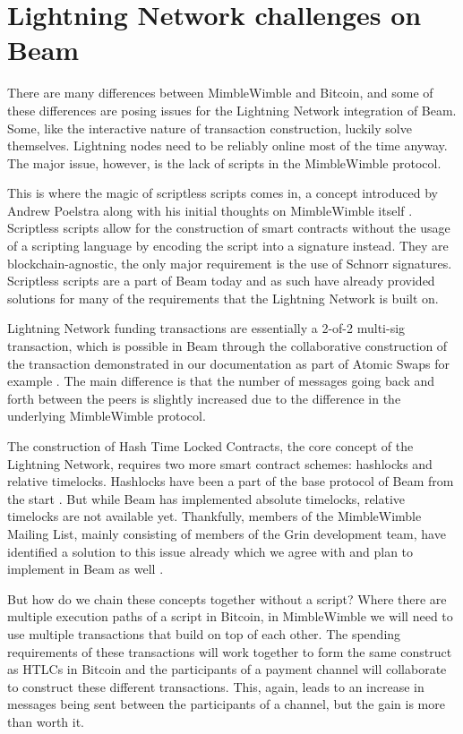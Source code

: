 \documentclass[letterpaper]{article}
\begin{document}
\section{Lightning Network challenges on Beam}
There are many differences between MimbleWimble and Bitcoin, and some of these differences are posing issues for the Lightning Network integration of Beam. Some, like the interactive nature of transaction construction, luckily solve themselves. Lightning nodes need to be reliably online most of the time anyway. The major issue, however, is the lack of scripts in the MimbleWimble protocol. 

This is where the magic of scriptless scripts comes in, a concept introduced by Andrew Poelstra along with his initial thoughts on MimbleWimble itself \cite{poelstra}. Scriptless scripts allow for the construction of smart contracts without the usage of a scripting language by encoding the script into a signature instead. They are blockchain-agnostic, the only major requirement is the use of Schnorr signatures. Scriptless scripts are a part of Beam today and as such have already provided solutions for many of the requirements that the Lightning Network is built on.

Lightning Network funding transactions are essentially a 2-of-2 multi-sig transaction, which is possible in Beam through the collaborative construction of the transaction demonstrated in our documentation as part of Atomic Swaps for example \cite{swap}. The main difference is that the number of messages going back and forth between the peers is slightly increased due to the difference in the underlying MimbleWimble protocol.

The construction of Hash Time Locked Contracts, the core concept of the Lightning Network, requires two more smart contract schemes: hashlocks and relative timelocks. Hashlocks have been a part of the base protocol of Beam from the start \cite{transaction}. But while Beam has implemented absolute timelocks, relative timelocks are not available yet. Thankfully, members of the MimbleWimble Mailing List, mainly consisting of members of the Grin development team, have identified a solution to this issue already which we agree with and plan to implement in Beam as well \cite{contracts}.

But how do we chain these concepts together without a script? Where there are multiple execution paths of a script in Bitcoin, in MimbleWimble we will need to use multiple transactions that build on top of each other. The spending requirements of these transactions will work together to form the same construct as HTLCs in Bitcoin and the participants of a payment channel will collaborate to construct these different transactions. This, again, leads to an increase in messages being sent between the participants of a channel, but the gain is more than worth it.
\end{document}
